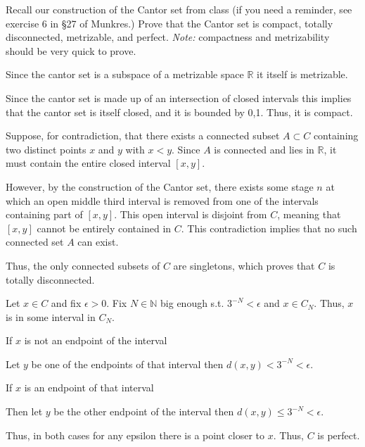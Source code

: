 \documentclass[12pt, letterpaper]{article}
\newcommand{\R}{\mathbb{R}}
\newcommand{\N}{\mathbb{N}}
\begin{document}
\begin{subproblem}{}
    Recall our construction of the Cantor set from class (if you
    need a reminder, see exercise 6 in \S27 of Munkres.) Prove that
    the Cantor set is compact, totally disconnected, metrizable, and
    perfect. \textit{Note:} compactness and metrizability should be
    very quick to prove.
\end{subproblem}
\begin{problemproof}
    Since the cantor set is a subspace of a metrizable space $\R$ it itself is metrizable.

    Since the cantor set is made up of an intersection of closed intervals this implies that the cantor set is itself closed, and it is bounded by 0,1. Thus, it is compact.

    Suppose, for contradiction, that there exists a connected subset $A \subset C$ containing two distinct points $x$ and $y$ with $x<y$. Since $A$ is connected and lies in $\R$, it must contain the entire closed interval $[x,y]$.

    However, by the construction of the Cantor set, there exists some stage $n$ at which an open middle third interval is removed from one of the intervals containing part of $[x,y]$. This open interval is disjoint from $C$, meaning that $[x,y]$ cannot be entirely contained in $C$. This contradiction implies that no such connected set $A$ can exist.

    Thus, the only connected subsets of $C$ are singletons, which proves that $C$ is totally disconnected.

    Let $x \in C$ and fix $\epsilon >0$. Fix $N \in \N$ big enough s.t. $3^{-N} < \epsilon$ and $x \in C_N$. Thus, $x$ is in some interval in $C_N$.

    If $x$ is not an endpoint of the interval

    Let $y$ be one of the endpoints of that interval then $d(x,y) < 3^{-N} < \epsilon$.

    If $x$ is an endpoint of that interval

    Then let $y$ be the other endpoint of the interval then $d(x,y) \leq 3^{-N} < \epsilon$.

    Thus, in both cases for any epsilon there is a point closer to $x$. Thus, $C$ is perfect.
\end{problemproof}
\end{document}
